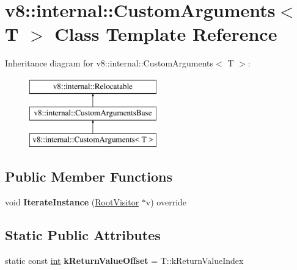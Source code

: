\hypertarget{classv8_1_1internal_1_1CustomArguments}{}\section{v8\+:\+:internal\+:\+:Custom\+Arguments$<$ T $>$ Class Template Reference}
\label{classv8_1_1internal_1_1CustomArguments}
Inheritance diagram for v8\+:\+:internal\+:\+:Custom\+Arguments$<$ T $>$\+:\begin{figure}[H]
\begin{center}
\leavevmode
\includegraphics[height=3.000000cm]{classv8_1_1internal_1_1CustomArguments}
\end{center}
\end{figure}
\subsection*{Public Member Functions}
\begin{DoxyCompactItemize}
\item 
\mbox{\label{classv8_1_1internal_1_1CustomArguments_ad144a48c919d63a46566a9d91743787f}} 
void {\bfseries Iterate\+Instance} (\mbox{\hyperlink{classv8_1_1internal_1_1RootVisitor}{Root\+Visitor}} $\ast$v) override
\end{DoxyCompactItemize}
\subsection*{Static Public Attributes}
\begin{DoxyCompactItemize}
\item 
\mbox{\label{classv8_1_1internal_1_1CustomArguments_a4665e0b15cda8ed07911cbb4a000f5cc}} 
static const \mbox{\hyperlink{classint}{int}} {\bfseries k\+Return\+Value\+Offset} = T\+::k\+Return\+Value\+Index
\end{DoxyCompactItemize}
